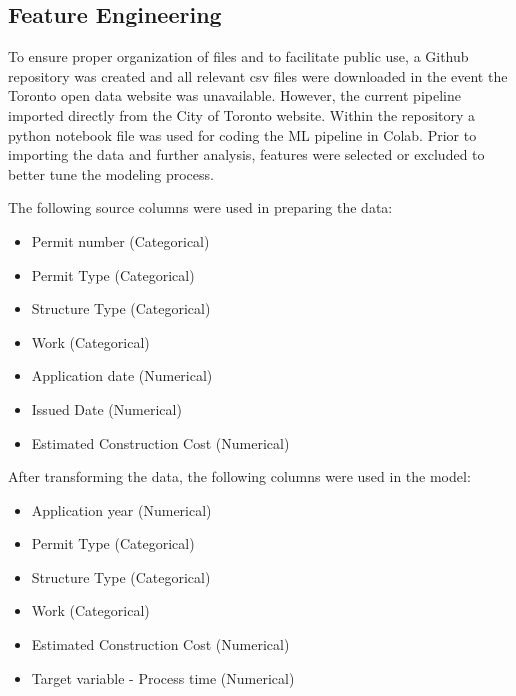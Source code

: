 \documentclass{article}
\begin{document}
\subsection{Feature Engineering}
To ensure proper organization of files and to facilitate public use, a Github repository was created and all relevant csv files were downloaded in the event the Toronto open data website was unavailable. However, the current pipeline imported directly from the City of Toronto website. Within the repository a python notebook file was used for coding the ML pipeline in Colab. Prior to importing the data and further analysis, features were selected or excluded to better tune the modeling process. 

The following source columns were used in preparing the data: 
\begin{itemize}
    \item Permit number (Categorical)
    \item Permit Type (Categorical)
    \item Structure Type (Categorical)
    \item Work (Categorical)
    \item Application date (Numerical)
    \item Issued Date (Numerical)
    \item Estimated Construction Cost (Numerical)
\end{itemize}

After transforming the data, the following columns were used in the model: 
\begin{itemize}
    \item Application year (Numerical)
    \item Permit Type (Categorical)
    \item Structure Type (Categorical)
    \item Work (Categorical)
    \item Estimated Construction Cost (Numerical)
    \item Target variable - Process time (Numerical)
\end{itemize}
\end{document}
